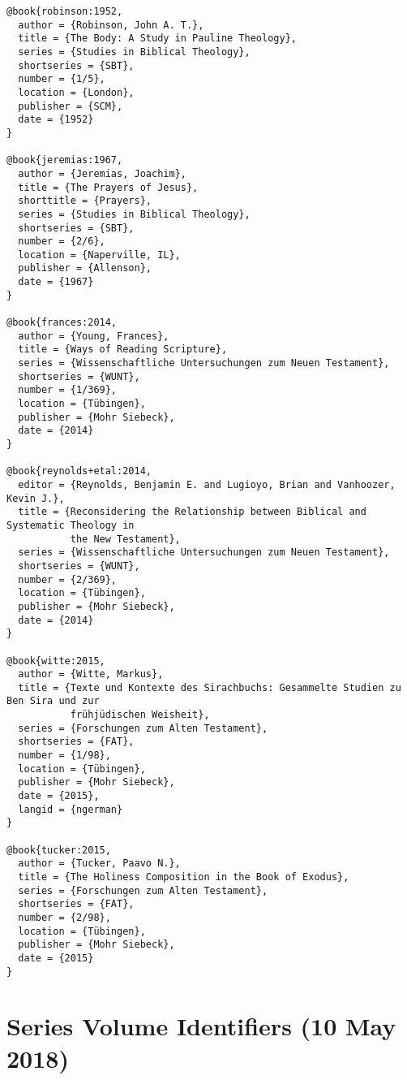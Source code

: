 \documentclass[a4paper]{article}
\begin{document}
\begin{verbatim}
@book{robinson:1952,
  author = {Robinson, John A. T.},
  title = {The Body: A Study in Pauline Theology},
  series = {Studies in Biblical Theology},
  shortseries = {SBT},
  number = {1/5},
  location = {London},
  publisher = {SCM},
  date = {1952}
}

@book{jeremias:1967,
  author = {Jeremias, Joachim},
  title = {The Prayers of Jesus},
  shorttitle = {Prayers},
  series = {Studies in Biblical Theology},
  shortseries = {SBT},
  number = {2/6},
  location = {Naperville, IL},
  publisher = {Allenson},
  date = {1967}
}

@book{frances:2014,
  author = {Young, Frances},
  title = {Ways of Reading Scripture},
  series = {Wissenschaftliche Untersuchungen zum Neuen Testament},
  shortseries = {WUNT},
  number = {1/369},
  location = {Tübingen},
  publisher = {Mohr Siebeck},
  date = {2014}
}

@book{reynolds+etal:2014,
  editor = {Reynolds, Benjamin E. and Lugioyo, Brian and Vanhoozer, Kevin J.},
  title = {Reconsidering the Relationship between Biblical and Systematic Theology in
           the New Testament},
  series = {Wissenschaftliche Untersuchungen zum Neuen Testament},
  shortseries = {WUNT},
  number = {2/369},
  location = {Tübingen},
  publisher = {Mohr Siebeck},
  date = {2014}
}

@book{witte:2015,
  author = {Witte, Markus},
  title = {Texte und Kontexte des Sirachbuchs: Gesammelte Studien zu Ben Sira und zur
           frühjüdischen Weisheit},
  series = {Forschungen zum Alten Testament},
  shortseries = {FAT},
  number = {1/98},
  location = {Tübingen},
  publisher = {Mohr Siebeck},
  date = {2015},
  langid = {ngerman}
}

@book{tucker:2015,
  author = {Tucker, Paavo N.},
  title = {The Holiness Composition in the Book of Exodus},
  series = {Forschungen zum Alten Testament},
  shortseries = {FAT},
  number = {2/98},
  location = {Tübingen},
  publisher = {Mohr Siebeck},
  date = {2015}
}
\end{verbatim}

\begin{verbcite}
  \nocite{robinson:1952, jeremias:1967, frances:2014, reynolds+etal:2014,
    witte:2015, tucker:2015}
\end{verbcite}
\exampleabbreviations
\examplebibliography
{}

\section{Series Volume Identifiers (10 May 2018)}
\end{document}
